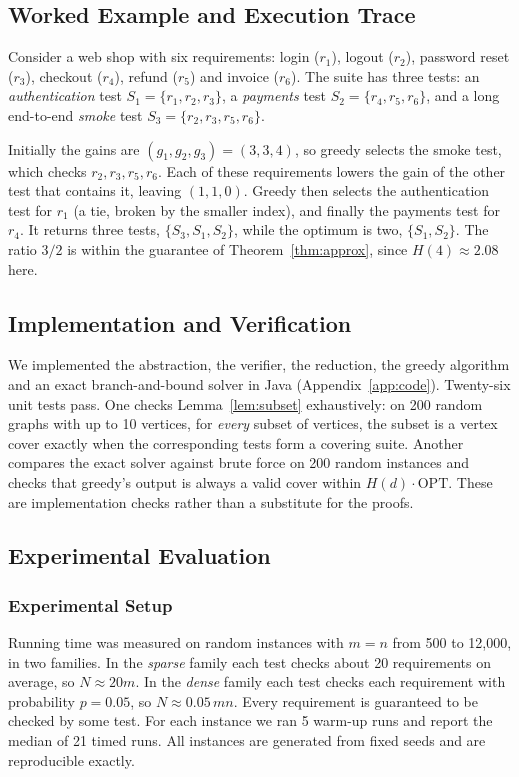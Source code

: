 \documentclass[conference]{IEEEtran}
\theoremstyle{definition}
\theoremstyle{remark}
\begin{document}
\subsection{Worked Example and Execution Trace}
\label{sec:p2-example}
Consider a web shop with six requirements: login ($r_1$), logout ($r_2$),
password reset ($r_3$), checkout ($r_4$), refund ($r_5$) and invoice ($r_6$).
The suite has three tests: an \emph{authentication} test
$S_1=\{r_1,r_2,r_3\}$, a \emph{payments} test $S_2=\{r_4,r_5,r_6\}$, and a
long end-to-end \emph{smoke} test $S_3=\{r_2,r_3,r_5,r_6\}$.

Initially the gains are $(g_1,g_2,g_3)=(3,3,4)$, so greedy selects the smoke
test, which checks $r_2,r_3,r_5,r_6$. Each of these requirements lowers the
gain of the other test that contains it, leaving $(1,1,0)$. Greedy then
selects the authentication test for $r_1$ (a tie, broken by the smaller
index), and finally the payments test for $r_4$. It returns three tests,
$\{S_3,S_1,S_2\}$, while the optimum is two, $\{S_1,S_2\}$. The ratio $3/2$
is within the guarantee of Theorem~\ref{thm:approx}, since
$H(4)\approx 2.08$ here.

\subsection{Implementation and Verification}
We implemented the abstraction, the verifier, the reduction, the greedy
algorithm and an exact branch-and-bound solver in Java
(Appendix~\ref{app:code}). Twenty-six unit tests pass. One checks
Lemma~\ref{lem:subset} exhaustively: on 200 random graphs with up to 10
vertices, for \emph{every} subset of vertices, the subset is a vertex cover
exactly when the corresponding tests form a covering suite. Another compares
the exact solver against brute force on 200 random instances and checks that
greedy's output is always a valid cover within $H(d)\cdot\mathrm{OPT}$. These
are implementation checks rather than a substitute for the proofs.

\subsection{Experimental Evaluation}
\label{sec:p2-experiments}
\subsubsection{Experimental Setup}
Running time was measured on random instances with $m = n$ from 500 to
12{,}000, in two families. In the \emph{sparse} family each test checks about
20 requirements on average, so $N \approx 20m$. In the \emph{dense} family
each test checks each requirement with probability $p = 0.05$, so
$N \approx 0.05\,mn$. Every requirement is guaranteed to be checked by some
test. For each instance we ran 5 warm-up runs and report the median of 21
timed runs. All instances are generated from fixed seeds and are reproducible
exactly.
\end{document}
